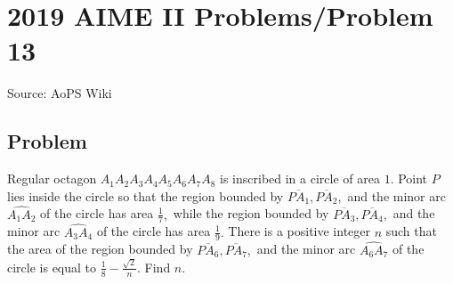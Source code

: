 \documentclass[12pt]{article}
\begin{document}
\section*{{2019 AIME II Problems/Problem 13}}
Source: AoPS Wiki

\subsection*{Problem}
Regular octagon $A_1A_2A_3A_4A_5A_6A_7A_8$ is inscribed in a circle of area $1.$ Point $P$ lies inside the circle so that the region bounded by $\overline{PA_1},\overline{PA_2},$ and the minor arc $\widehat{A_1A_2}$ of the circle has area $\tfrac{1}{7},$ while the region bounded by $\overline{PA_3},\overline{PA_4},$ and the minor arc $\widehat{A_3A_4}$ of the circle has area $\tfrac{1}{9}.$ There is a positive integer $n$ such that the area of the region bounded by $\overline{PA_6},\overline{PA_7},$ and the minor arc $\widehat{A_6A_7}$ of the circle is equal to $\tfrac{1}{8}-\tfrac{\sqrt2}{n}.$ Find $n.$
\end{document}
